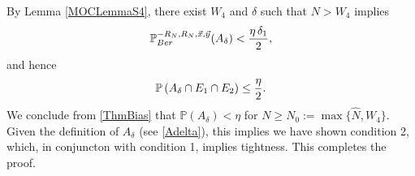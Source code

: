 	By Lemma \ref{MOCLemmaS4}, there exist $W_4$ and $\delta$ such that $N>W_4$ implies
	\[
	\mathbb{P}_{Ber}^{-R_N,R_N,\vec x,\vec y}(A_\delta)<\frac{\eta\,\delta_1}2,
	\] 
	and hence $$\mathbb{P}\left(A_\delta\cap E_1\cap E_2\right)\leq \frac{\eta}{2}.$$ We conclude from \eqref{ThmBias} that $\mathbb{P}(A_\delta) < \eta$ for $N\geq N_0 := \max\{\hat N, W_4\}$. Given the definition of $A_\delta$ (see \ref{Adelta}), this implies we have shown condition 2, which, in conjuncton with condition 1, implies tightness. This completes the proof.

